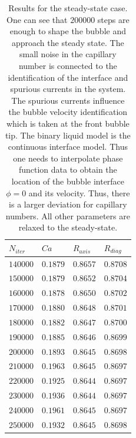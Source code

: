 \documentclass[preprint,12pt]{elsarticle}
\begin{document}
\begin{table}
\begin{tabularx}{\textwidth}{|X|X|X|X|}
\hline
$N_{iter}$&$Ca$&$R_{axis}$&$R_{diag}$\\
\hline
$140000$&$0.1879$&$0.8657$&$0.8708$\\
$150000$&$0.1879$&$0.8652$&$0.8704$\\
$160000$&$0.1878$&$0.8650$&$0.8702$\\
$170000$&$0.1880$&$0.8648$&$0.8701$\\
$180000$&$0.1882$&$0.8647$&$0.8700$\\
$190000$&$0.1885$&$0.8646$&$0.8699$\\
$200000$&$0.1893$&$0.8645$&$0.8698$\\
$210000$&$0.1963$&$0.8645$&$0.8697$\\
$220000$&$0.1925$&$0.8644$&$0.8697$\\
$230000$&$0.1936$&$0.8644$&$0.8697$\\
$240000$&$0.1961$&$0.8645$&$0.8697$\\
$250000$&$0.1932$&$0.8645$&$0.8698$\\
\hline
\end{tabularx}
\caption{Results for the steady-state case. One
can see that $200000$ steps are enough to shape
the bubble and approach the steady state. The small noise in the capillary number is connected to
the identification of the interface and spurious currents in the system. The spurious currents
influence the bubble velocity identification which is taken at the front bubble tip. The binary
liquid model is the continuous interface model. Thus one needs to interpolate phase function data to
obtain the location of the bubble interface $\phi=0$ and its velocity. Thus, there is a larger
deviation for capillary numbers. All other parameters are relaxed to the
steady-state.\label{table:steady:state}}
\end{table}
\end{document}
